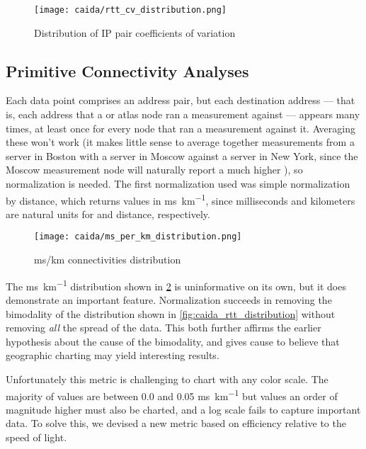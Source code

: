 \begin{figure}[h]
    \centering
    \texttt{[image: caida/rtt\_cv\_distribution.png]}
    \caption{Distribution of IP pair coefficients of variation}
    \label{fig:caida_cv_distribution}
\end{figure}

\subsection{Primitive Connectivity Analyses}

Each data point comprises an \ip address pair, but each destination \ip address --- that is, each \ip address that a \caida or \ripe atlas node ran a measurement against --- appears many times, at least once for every node that ran a measurement against it. Averaging these won't work (it makes little sense to average together measurements from a server in Boston with a server in Moscow against a server in New York, since the Moscow measurement node will naturally report a much higher \rtt), so normalization is needed. The first normalization used was simple normalization by distance, which returns values in \si{\milli\second\per\kilo\meter}, since milliseconds and kilometers are natural units for \rtts and distance, respectively.

\begin{figure}[h]
    \centering
    \texttt{[image: caida/ms\_per\_km\_distribution.png]}
    \caption{ms/km connectivities distribution}
    \label{fig:caida_ms_per_km_distribution}
\end{figure}

The \si{\milli\second\per\kilo\meter} distribution shown in \cref{fig:caida_ms_per_km_distribution} is uninformative on its own, but it does demonstrate an important feature. Normalization succeeds in removing the bimodality of the \rtt distribution shown in \cref{fig:caida_rtt_distribution} without removing \textit{all} the spread of the data. This both further affirms the earlier hypothesis about the cause of the bimodality, and gives cause to believe that geographic charting may yield interesting results.

Unfortunately this metric is challenging to chart with any color scale. The majority of values are between 0.0 and 0.05 \si{\milli\second\per\kilo\meter} but values an order of magnitude higher must also be charted, and a log scale fails to capture important data. To solve this, we devised a new metric based on efficiency relative to the speed of light.

